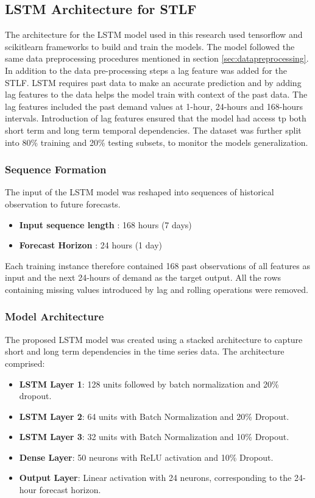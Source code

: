  \subsection{LSTM Architecture for STLF}
 
 The architecture for the LSTM model used in this research used tensorflow and scikitlearn frameworks to build and train the models. The model followed the same data preprocessing procedures mentioned in section \ref{sec:datapreprocessing}. In addition to the data pre-processing steps a lag feature was added for the STLF. LSTM requires past data to make an accurate prediction and by adding lag features to the data helps the model train with context of the past data. The lag features included the past demand values at 1-hour, 24-hours and 168-hours intervals. Introduction of lag features ensured that the model had access tp both short term and long term temporal dependencies. The dataset was further split into 80\% training and 20\% testing subsets, to monitor the models generalization.
 
 \subsubsection{Sequence Formation}
 The input of the LSTM model was reshaped into sequences of historical observation to future forecasts.
 {\small
 \begin{itemize}
 	\item \textbf{Input sequence length} : 168 hours (7 days)
 	\item \textbf{Forecast Horizon} : 24 hours (1 day)
 \end{itemize}
}
 Each training instance therefore contained 168 past observations of all features as input and the next 24-hours of demand as the target output. All the rows containing missing values introduced by lag and rolling operations were removed.
 
 \subsubsection{Model Architecture}
 
 The proposed LSTM model was created using a stacked architecture to capture short and long term dependencies in the time series data. The architecture comprised: 
 {\small 
 \begin{itemize}
 	\item \textbf{LSTM Layer 1}: 128 units followed by batch normalization and 20\% dropout.
 	\item \textbf{LSTM Layer 2}: 64 units with Batch Normalization and 20\% Dropout.
 	
 	\item\textbf{LSTM Layer 3}: 32 units with Batch Normalization and 10\% Dropout.
 	
 	\item \textbf{Dense Layer}: 50 neurons with ReLU activation and 10\% Dropout.
 	
   \item\textbf{ Output Layer}: Linear activation with 24 neurons, corresponding to the 24-hour forecast horizon.
 \end{itemize}
}
 
